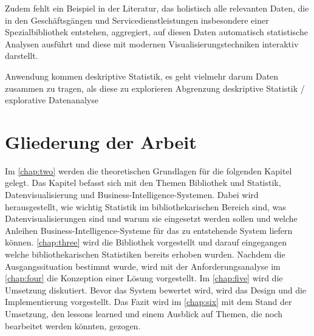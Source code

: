 Zudem fehlt ein Beispiel in der Literatur, das holistisch alle relevanten Daten, die in den
Geschäftsgängen und Servicedienstleistungen insbesondere einer Spezialbibliothek entstehen,
aggregiert, auf diesen Daten automatisch statistische Analysen ausführt und diese mit modernen Visualisierungstechniken
interaktiv darstellt.

Anwendung kommen deskriptive Statistik, es geht vielmehr darum Daten zusammen zu tragen, als diese zu explorieren 
Abgrenzung deskriptive Statistik / explorative Datenanalyse

\section{Gliederung der Arbeit}
Im \autoref{chap:two} werden die theoretischen Grundlagen für die folgenden Kapitel gelegt. Das Kapitel befasst
sich mit den Themen Bibliothek und Statistik, Datenvisualisierung und Business-Intelligence-Systemen. Dabei wird herausgestellt, wie wichtig Statistik
im bibliothekarischen Bereich sind, was Datenvisualisierungen sind und warum sie eingesetzt werden sollen und welche Anleihen Business-Intelligence-Systeme 
für das zu entstehende System liefern können. \autoref{chap:three}
wird die Bibliothek vorgestellt und darauf eingegangen welche bibliothekarischen Statistiken bereits erhoben wurden.
Nachdem die Ausgangssituation bestimmt wurde, wird mit der Anforderungsanalyse im \autoref{chap:four} die Konzeption einer Lösung vorgestellt.
Im \autoref{chap:five} wird die Umsetzung diskutiert. Bevor das System bewertet wird, wird das Design und die Implementierung vorgestellt.
Das Fazit wird im \autoref{chap:six} mit dem Stand der Umsetzung, den lessons learned und einem Ausblick auf Themen, die noch bearbeitet werden könnten, gezogen.
